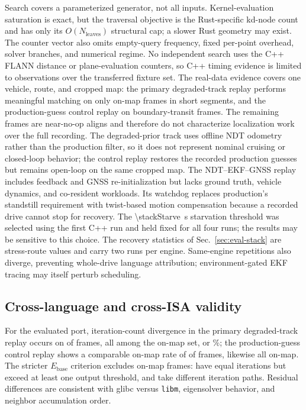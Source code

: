 Search covers a parameterized generator, not all inputs. Kernel-evaluation saturation is
exact, but the traversal objective is the Rust-specific kd-node count and has only its
$O(N_{\mathrm{leaves}})$ structural cap; a slower Rust geometry may exist. The counter vector also omits empty-query frequency, fixed per-point overhead,
solver branches, and numerical regime. No independent search uses the C++ FLANN distance or
plane-evaluation counters, so C++ timing evidence is limited to observations over the
transferred fixture set. The real-data evidence covers one
vehicle, route, and cropped map: the primary degraded-track replay performs meaningful
matching on only \realOnMap{} on-map frames in \realSegments{} short segments, and the
production-guess control replay on \realProdOnMap{} boundary-transit frames. The remaining
frames are near-no-op aligns and therefore do not characterize localization
work over the full recording. The degraded-prior track uses offline NDT odometry rather than
the production filter, so it does not represent nominal cruising or closed-loop behavior;
the control replay restores the recorded production guesses but remains open-loop on the
same cropped map.
The NDT--EKF--GNSS replay includes feedback and GNSS re-initialization but lacks ground
truth, vehicle dynamics, and co-resident workloads. Its watchdog replaces production's
standstill requirement with twist-based motion compensation because a recorded drive
cannot stop for recovery. The \SI{\stackStarve}{s} starvation threshold was selected using
the first C++ run and held fixed for all four runs; the results may be sensitive to this
choice. The recovery statistics of Sec.~\ref{sec:eval-stack} are stress-route values and
carry two runs per engine. Same-engine repetitions also diverge, preventing whole-drive
language attribution; environment-gated EKF tracing may itself perturb scheduling.

\subsection{Cross-language and cross-ISA validity}
For the evaluated port, iteration-count divergence in the primary degraded-track replay
occurs on \realIterationDivergent{} of \realFrames{} frames, all among the \realOnMap{}
on-map set, or \realOnMapDivPct\%; the production-guess control replay shows a comparable
on-map rate of \realProdIterationDivergent{} of \realProdOnMap{} frames, likewise all
on-map. The stricter $E_{\mathrm{base}}$ criterion excludes
\realBaseDivergent{} on-map frames: \realOutputDivergent{} have equal iterations but exceed
at least one output threshold, and \realIterationDivergent{} take different iteration
paths. Residual differences are consistent with glibc versus \texttt{libm}, eigensolver
behavior, and neighbor accumulation order.

